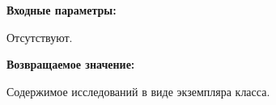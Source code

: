 \textbf{Входные параметры:}

Отсутствуют.

\textbf{Возвращаемое значение:}

Содержимое исследований в виде экземпляра класса.